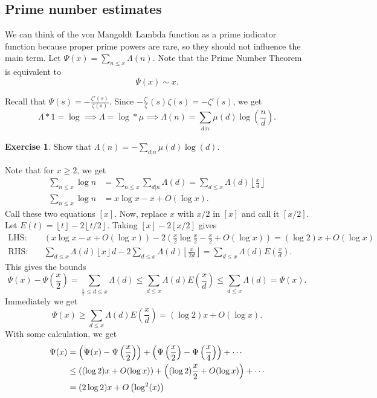 \documentclass[11pt]{article}
\theoremstyle{definition}
\newtheorem{exe}[thm]{Exercise}
\newcommand{\floor}[1]{\left\lfloor #1 \right\rfloor}
\newcommand{\La}[0]{\Lambda}
\begin{document}
\subsection{Prime number estimates}

We can think of the von Mangoldt Lambda function as a prime indicator function because
proper prime powers are rare, so they should not influence the main term. Let
$\Psi(x)=\sum_{n\le x}\La(n)$. Note that the Prime Number Theorem is equivalent to
\[
\Psi(x)\sim x .
\]

Recall that $\Psi(s)=-\frac{\zeta'(s)}{\zeta(s)}$. Since
$-\frac{\zeta'}{\zeta}(s)\zeta(s)=-\zeta'(s)$, we get
\[
\La*1 = \log \implies \La=\log*\mu
\implies \La(n) = \sum_{d|n}\mu(d)\log\left(\frac{n}{d}\right) .
\]

\begin{exe}
Show that $\La(n)=-\sum_{d|n}\mu(d)\log(d)$.
\end{exe}

Note that for $x\ge2$, we get
\begin{align}
\sum_{n\le x} \log n &= \sum_{n\le x} \sum_{d|n} \La(d)
= \sum_{d\le x} \La(d)\floor{\frac{x}{d}}
 \label{1840cheby1} \\
\sum_{n\le x} \log n &= x\log x - x + O(\log x) .
 \label{1840cheby2}
\end{align}
Call these two equations $[x]$. Now, replace $x$ with $x/2$ in $[x]$ and call it $[x/2]$.
Let $E(t)=\floor{t}-2\floor{t/2}$. Taking $[x]-2[x/2]$ gives
\begin{align*}
\text{LHS:}&~~~~~
(x\log x - x + O(\log x)) - 2\left(\frac{x}2\log\frac{x}2 - \frac{x}2 + O(\log x)\right)
= (\log2)x + O(\log x) \\
\text{RHS:}&~~~~~
\sum_{d\le x}\La(d)\floor{x}{d} - 2\sum_{d\le x}\La(d)\floor{\frac{x}{2d}}
= \sum_{d\le x} \La(d)E\left(\frac{x}{d}\right) .
\end{align*}
This gives the bounds
\[
\Psi(x)-\Psi\left(\frac{x}{2}\right)
= \sum_{\frac{x}{2}\le d\le x} \La(d)
\le \sum_{d\le x} \La(d)E\left(\frac{x}{d}\right)
\le \sum_{d\le x} \La(d) = \Psi(x) .
\]
Immediately we get
\begin{equation}
\Psi(x)\ge\sum_{d\le x}\La(d)E\left(\frac{x}{d}\right)
= (\log2)x + O(\log x) .
\end{equation}
With some calculation, we get
\begin{align}
\Psi(x) &= \left(\Psi(x)-\Psi\left(\frac{x}{2}\right)\right)
+ \left(\Psi\left(\frac{x}{2}\right)-\Psi\left(\frac{x}{4}\right)\right) + \cdots \notag \\
&\le \left((\log2)x+O(\log x)\right) + \left((\log2)\frac{x}{2}+O(\log x)\right) + \cdots
\notag \\
&= (2\log2)x + O\left(\log^2(x)\right)
\end{align}
\end{document}
